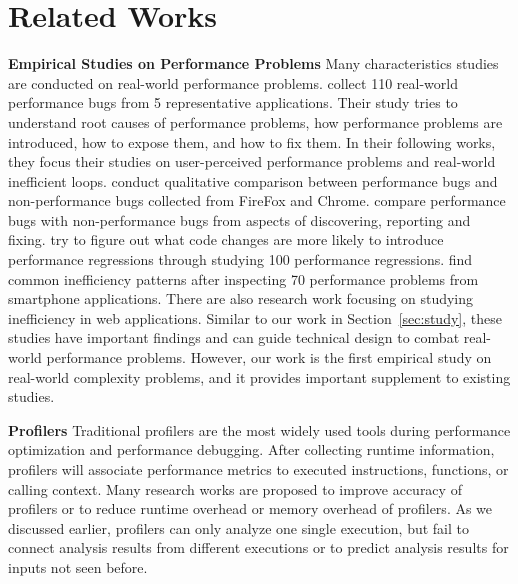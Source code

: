
\section{Related Works}
\label{sec:related}

\noindent\textbf{Empirical Studies on Performance Problems}
Many characteristics studies are conducted on real-world performance
problems\cite{PerfBug,SongOOPSLA2014,ldoctor,Zaman2012MSR,Nistor2013MSR,HuangRegression,SmartphoneStudy,junwen-1, junwen-2}.
\cite{PerfBug} collect 110 real-world performance bugs from 5 representative applications.
Their study tries to understand root causes of performance problems,
how performance problems are introduced, how to expose them, and how to fix them.
In their following works, they focus their studies on
user-perceived performance problems\cite{SongOOPSLA2014}
and real-world inefficient loops\cite{ldoctor}.
\cite{Zaman2012MSR} conduct qualitative comparison between performance bugs
and non-performance bugs collected from FireFox and Chrome.
\cite{Nistor2013MSR} compare performance bugs with non-performance bugs
from aspects of discovering, reporting and fixing.
\cite{HuangRegression} try to figure out what code changes are more likely to introduce performance regressions through
studying 100 performance regressions.
\cite{SmartphoneStudy} find common inefficiency patterns after
inspecting 70 performance problems from smartphone applications.
There are also research work focusing on studying inefficiency in web applications\cite{junwen-1, junwen-2}.
Similar to our work in Section~\ref{sec:study},
these studies have important findings and can guide technical design to combat
real-world performance problems.
However, our work is the first empirical study on real-world complexity problems,
and it provides important supplement to existing studies.

\noindent\textbf{Profilers}
Traditional profilers are the most widely used tools
during performance optimization and performance debugging.
After collecting runtime information,
profilers will associate performance metrics to executed instructions,
functions, or calling context\cite{oprofile,gprof, CCT}.
Many research works are proposed to improve
accuracy of profilers\cite{4Profilers, LagHunter, AppInsight} or
to reduce runtime overhead\cite{AdaptiveBurst}
or memory overhead of profilers\cite{HotCallingContext}.
As we discussed earlier, profilers can only analyze one single execution,
but fail to connect analysis results from different executions
or to predict analysis results for inputs not seen before.

